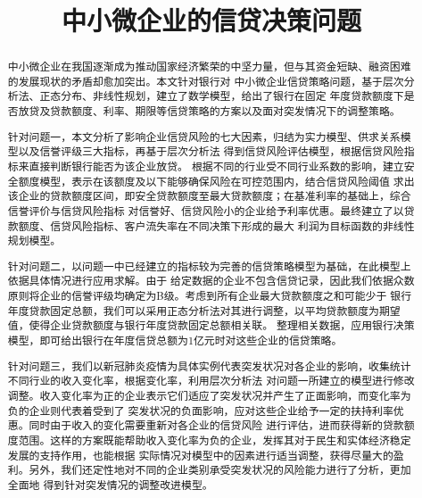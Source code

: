 \documentclass[withoutpreface,bwprint]{cumcmthesis}
\title{中小微企业的信贷决策问题}
\begin{document}
 \maketitle
 \begin{abstract}
    中小微企业在我国逐渐成为推动国家经济繁荣的中坚力量，但与其资金短缺、融资困难的发展现状的矛盾却愈加突出。本文针对银行对
    中小微企业信贷策略问题，基于层次分析法、正态分布、非线性规划，建立了数学模型，给出了银行在固定
    年度贷款额度下是否放贷及贷款额度、利率、期限等信贷策略的方案以及面对突发情况下的调整策略。
    
    针对问题一，本文分析了影响企业信贷风险的七大因素，归结为实力模型、供求关系模型以及信誉评级三大指标，再基于层次分析法
    得到信贷风险评估模型，根据信贷风险指标来直接判断银行能否为该企业放贷。
    根据不同的行业受不同行业系数的影响，建立安全额度模型，表示在该额度及以下能够确保风险在可控范围内，结合信贷风险阈值
    求出该企业的贷款额度区间，即安全贷款额度至最大贷款额度；在基准利率的基础上，综合信誉评价与信贷风险指标
    对信誉好、信贷风险小的企业给予利率优惠。最终建立了以贷款额度、信贷风险指标、客户流失率在不同决策下形成的最大
    利润为目标函数的非线性规划模型。 

    针对问题二，以问题一中已经建立的指标较为完善的信贷策略模型为基础，在此模型上依据具体情况进行应用求解。由于
    给定数据的企业不包含信贷记录，因此我们依据众数原则将企业的信誉评级均确定为B级。考虑到所有企业最大贷款额度之和可能少于
    银行年度贷款固定总额，我们可以采用正态分析法对其进行调整，以平均贷款额度为期望值，使得企业贷款额度与银行年度贷款固定总额相关联。
    整理相关数据，应用银行决策模型，即可给出银行在年度信贷总额为1亿元时对这些企业的信贷策略。

    针对问题三，我们以新冠肺炎疫情为具体实例代表突发状况对各企业的影响，收集统计不同行业的收入变化率，根据变化率，利用层次分析法
    对问题一所建立的模型进行修改调整。收入变化率为正的企业表示它们适应了突发状况并产生了正面影响，而变化率为负的企业则代表着受到了
    突发状况的负面影响，应对这些企业给予一定的扶持利率优惠。同时由于收入的变化需要重新对各企业的信贷风险
    进行评估，进而获得新的贷款额度范围。这样的方案既能帮助收入变化率为负的企业，发挥其对于民生和实体经济稳定发展的支持作用，也能根据
    实际情况对模型中的因素进行适当调整，获得尽量大的盈利。另外，我们还定性地对不同的企业类别承受突发状况的风险能力进行了分析，更加全面地
    得到针对突发情况的调整改进模型。

    \newpage
\end{abstract}
\end{document}
